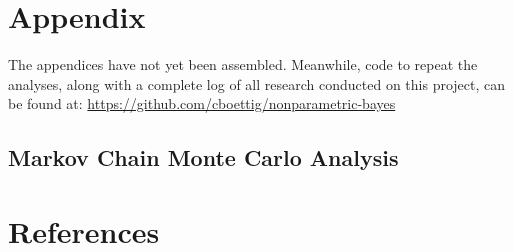 \documentclass[author-year, review]{elsarticle} %
\begin{document}
\section{Appendix}

The appendices have not yet been assembled. Meanwhile, code to repeat
the analyses, along with a complete log of all research conducted on
this project, can be found at:
\href{https://github.com/cboettig/nonparametric-bayes/}{https://github.com/cboettig/nonparametric-bayes}

\subsection{Markov Chain Monte Carlo Analysis}

\section{References}
\end{document}
